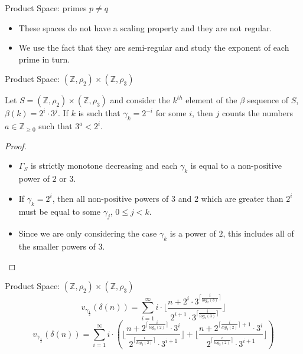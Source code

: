 \documentclass{beamer}
\theoremstyle{definition}
\begin{document}
\begin{frame}{Product Space: primes $p \neq q$}
	\begin{itemize}
		\item These spaces do not have a scaling property and they are not regular.
		\pause
		\item We use the fact that they are semi-regular and study the exponent of each prime in turn.
	\end{itemize}
\end{frame}

\begin{frame}{Product Space: $(\mathbb{Z},\rho_2) \times (\mathbb{Z},\rho_3)$}
\begin{lemma}
	Let $S = (\mathbb{Z},\rho_2) \times (\mathbb{Z},\rho_3) $ and consider the $k^{th}$ element of the $\beta$ sequence of $S$, $\beta(k) = 2^i \cdot 3^j$. If $k$ is such that $\gamma_k=2^{-i}$ for some $i$, then $j$ counts the numbers $a \in \mathbb{Z}_{\geq 0}$ such that $3^a < 2^{i}$.
\end{lemma}
\pause
\begin{proof}
	\begin{itemize}
	\item $\Gamma_S$ is strictly monotone decreasing and each $\gamma_k$ is equal to a non-positive power of $2$ or $3$. \pause
	\item If $\gamma_k = 2^i$, then all non-positive powers of $3$ and $2$ which are greater than $2^i$ must be equal to some $\gamma_j$, $0 \leq j < k$.\pause %
	\item Since we are only considering the case $\gamma_k$ is a power of $2$, this includes all of the smaller powers of $3$.
	\end{itemize}
\end{proof}
\end{frame}
\begin{frame}{Product Space: $(\mathbb{Z},\rho_2) \times (\mathbb{Z},\rho_3)$}
	 \[v_{\gamma_{\frac{1}{2}}}(\delta(n)) = \sum_{i=1}^\infty i \cdot \lfloor\frac{n + 2^i \cdot 3^{\lceil \frac{i}{log_2(3)}\rceil}}{2^{i+1}\cdot 3^{\lceil \frac{i}{log_2(3)}\rceil}} \rfloor\]
		\pause
	 \[v_{\gamma_{\frac{1}{3}}}(\delta(n)) = \sum_{i=1}^\infty i \cdot (\lfloor\frac{n + 2^{\lceil \frac{i}{log_3(2)}\rceil} \cdot 3^i}{2^{\lceil \frac{i}{log_3(2)}\rceil}\cdot 3^{i+1}} \rfloor + \lfloor\frac{n + 2^{\lceil \frac{i}{log_3(2)}\rceil+1} \cdot 3^i}{2^{\lceil \frac{i}{log_3(2)}\rceil}\cdot 3^{i+1}} \rfloor) \]
\end{frame}
\end{document}
